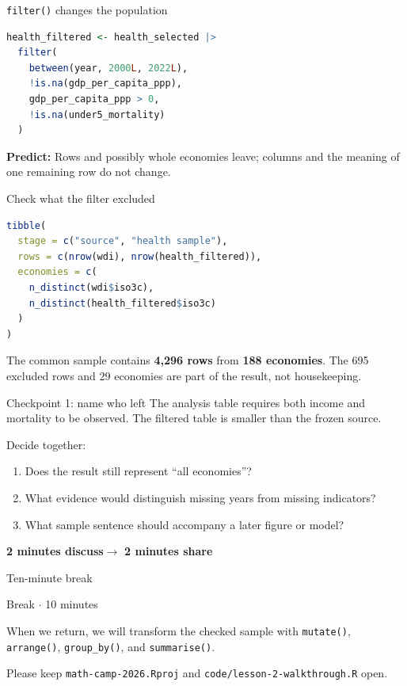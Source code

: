 \begin{frame}[fragile]{\texttt{filter()} changes the population}
\begin{lstlisting}[language=R]
health_filtered <- health_selected |>
  filter(
    between(year, 2000L, 2022L),
    !is.na(gdp_per_capita_ppp),
    gdp_per_capita_ppp > 0,
    !is.na(under5_mortality)
  )
\end{lstlisting}

  \textbf{Predict:} Rows and possibly whole economies leave; columns and the
  meaning of one remaining row do not change.
\end{frame}

\begin{frame}[fragile]{Check what the filter excluded}
\begin{lstlisting}[language=R]
tibble(
  stage = c("source", "health sample"),
  rows = c(nrow(wdi), nrow(health_filtered)),
  economies = c(
    n_distinct(wdi$iso3c),
    n_distinct(health_filtered$iso3c)
  )
)
\end{lstlisting}

  The common sample contains \textbf{4,296 rows} from \textbf{188 economies}.
  The 695 excluded rows and 29 economies are part of the result, not housekeeping.
\end{frame}

\begin{frame}{Checkpoint 1: name who left}
  The analysis table requires both income and mortality to be observed. The
  filtered table is smaller than the frozen source.

  \vspace{0.5em}
  Decide together:
  \begin{enumerate}
    \item Does the result still represent ``all economies''?
    \item What evidence would distinguish missing years from missing indicators?
    \item What sample sentence should accompany a later figure or model?
  \end{enumerate}

  \vfill
  \centering
  \textbf{2 minutes discuss}\qquad$\longrightarrow$\qquad
  \textbf{2 minutes share}
\end{frame}

\begin{frame}{Ten-minute break}
  \vfill
  \begin{center}
    {\LARGE\color{crimson}Break \(\cdot\) 10 minutes}

    \vspace{0.9em}
    When we return, we will transform the checked sample with
    \texttt{mutate()}, \texttt{arrange()}, \texttt{group\_by()}, and
    \texttt{summarise()}.

    \vspace{0.9em}
    Please keep \texttt{math-camp-2026.Rproj} and
    \texttt{code/lesson-2-walkthrough.R} open.
  \end{center}
  \vfill
\end{frame}

